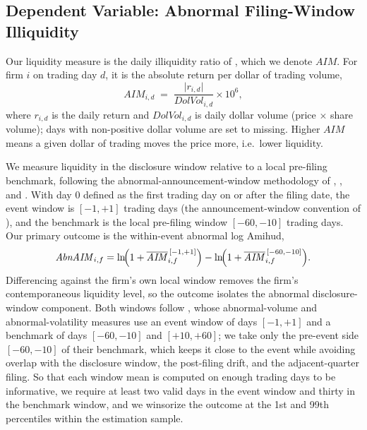 \documentclass[12pt]{article}
\begin{document}
\subsection{Dependent Variable: Abnormal Filing-Window Illiquidity}\label{sec:data_dv}
Our liquidity measure is the daily illiquidity ratio of \citet{Amihud2002}, which we denote $\mathit{AIM}$. For firm $i$ on trading day $d$, it is the absolute return per dollar of trading volume,
\begin{equation}
\mathit{AIM}_{i,d} \;=\; \frac{\lvert r_{i,d}\rvert}{\mathit{DolVol}_{i,d}}\times 10^{6},
\end{equation}
where $r_{i,d}$ is the daily return and $\mathit{DolVol}_{i,d}$ is daily dollar volume (price $\times$ share volume); days with non-positive dollar volume are set to missing. Higher $\mathit{AIM}$ means a given dollar of trading moves the price more, i.e.\ lower liquidity.

We measure liquidity in the disclosure window relative to a local pre-filing benchmark, following the abnormal-announcement-window methodology of \citet{Beaver1968}, \citet{LandsmanMaydew2002}, and \citet{LandsmanMaydewThornock2012}. With day $0$ defined as the first trading day on or after the filing date, the event window is $[-1,+1]$ trading days (the announcement-window convention of \citet{LandsmanMaydewThornock2012}), and the benchmark is the local pre-filing window $[-60,-10]$ trading days. Our primary outcome is the within-event abnormal log Amihud,
\begin{equation}
\mathit{AbnAIM}_{i,f}
= \ln\!\Bigl(1+\overline{\mathit{AIM}}^{\,[-1,+1]}_{i,f}\Bigr)
- \ln\!\Bigl(1+\overline{\mathit{AIM}}^{\,[-60,-10]}_{i,f}\Bigr).
\end{equation}
Differencing against the firm's own local window removes the firm's contemporaneous liquidity level, so the outcome isolates the abnormal disclosure-window component. Both windows follow \citet{LandsmanMaydewThornock2012}, whose abnormal-volume and abnormal-volatility measures use an event window of days $[-1,+1]$ and a benchmark of days $[-60,-10]$ and $[+10,+60]$; we take only the pre-event side $[-60,-10]$ of their benchmark, which keeps it close to the event while avoiding overlap with the disclosure window, the post-filing drift, and the adjacent-quarter filing. So that each window mean is computed on enough trading days to be informative, we require at least two valid days in the event window and thirty in the benchmark window, and we winsorize the outcome at the 1st and 99th percentiles within the estimation sample.
\end{document}
